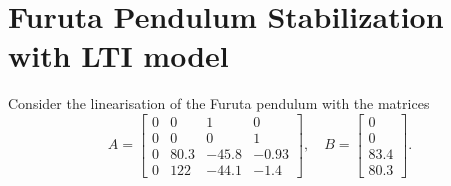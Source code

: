 \documentclass[10pt,letterpaper,twocolumn]{scrartcl}
\begin{document}
\section{Furuta Pendulum Stabilization with LTI model}

Consider the linearisation of the Furuta pendulum with the matrices
\[
    A = \begin{bmatrix} 0 & 0 & 1 & 0 \\ 0 & 0 & 0 & 1 \\ 0 & 80.3 & -45.8 & -0.93 \\ 0 & 122 & -44.1 & -1.4 \end{bmatrix}, \quad
    B = \begin{bmatrix} 0 \\ 0 \\ 83.4 \\ 80.3 \end{bmatrix}
.\]
\end{document}
